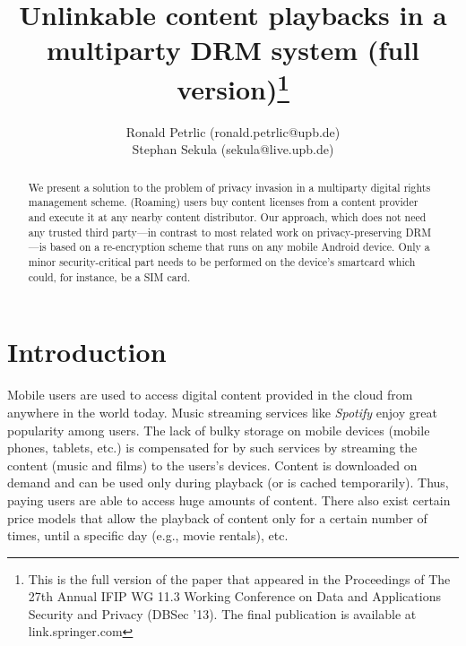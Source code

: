 \documentclass{llncs}
\begin{document}
\title{Unlinkable content playbacks in a\\ multiparty DRM system (full version)\thanks{This is the full version of the paper that appeared in the Proceedings of The 27th Annual IFIP WG 11.3 Working Conference on Data and Applications Security and Privacy (DBSec '13). The final publication is available at link.springer.com}} 
\author{Ronald Petrlic (ronald.petrlic@upb.de)\\ Stephan Sekula (sekula@live.upb.de)}


\maketitle

\begin{abstract}

We present a solution to the problem of privacy invasion in a multiparty digital rights management scheme. (Roaming) users buy content licenses from a content provider and execute it at any nearby content distributor. Our approach, which does not need any trusted third party---in contrast to most related work on privacy-preserving DRM---is based on a re-encryption scheme that runs on any mobile Android device. Only a minor security-critical part needs to be performed on the device's smartcard which could, for instance, be a SIM card.

\end{abstract}


\section{Introduction} \label{introduction}

Mobile users are used to access digital content provided in the cloud from anywhere in the world today. Music streaming services like \emph{Spotify} enjoy great popularity among users. The lack of bulky storage on mobile devices (mobile phones, tablets, etc.) is compensated for by such services by streaming the content (music and films) to the users's devices. Content is downloaded on demand and can be used only during playback (or is cached temporarily). Thus, paying users are able to access huge amounts of content. There also exist certain price models that allow the playback of content only for a certain number of times, until a specific day (e.g., movie rentals), etc. 
\end{document}
